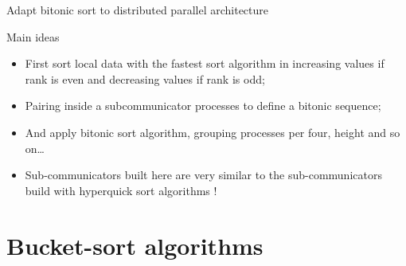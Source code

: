 \documentclass[compress,10pt,aspectratio=169]{beamer}
\begin{document}
    \begin{frame}{Adapt bitonic sort to distributed parallel architecture}
        \scriptsize
        \begin{block}{Main ideas}
            \begin{itemize}
                \item First sort local data with the fastest sort algorithm in increasing values if rank is even and decreasing values if rank is odd;
                \item Pairing inside a subcommunicator  processes to define a bitonic sequence;
                \item And apply bitonic sort algorithm, grouping processes per four, height and so on\ldots
                \item Sub-communicators built here are very similar to the sub-communicators build with hyperquick sort algorithms !
            \end{itemize}
        \end{block}

    \end{frame}

\section{Bucket-sort algorithms}
\end{document}
